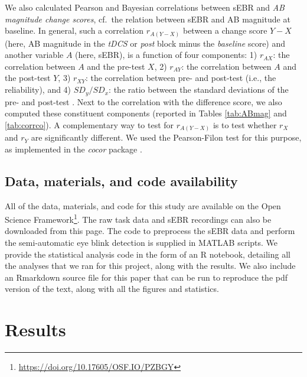 \documentclass[11pt,]{memoir}
\let\rmarkdownfootnote\footnote%
\def\footnote{\protect\rmarkdownfootnote}
\renewcommand{\href}[2]{#2\footnote{\url{#1}}} %
\begin{document}
We also calculated Pearson and Bayesian correlations between sEBR and \emph{AB magnitude change scores}, cf.~the relation between sEBR and AB magnitude at baseline. In general, such a correlation \(r_{A(Y-X)}\) between a change score \(Y-X\) (here, AB magnitude in the \emph{tDCS} or \emph{post} block minus the \emph{baseline} score) and another variable \(A\) (here, sEBR), is a function of four components: 1) \(r_{AX}\): the correlation between \(A\) and the pre-test \(X\), 2) \(r_{AY}\): the correlation between \(A\) and the post-test \(Y\), 3) \(r_{XY}\): the correlation between pre- and post-test (i.e., the reliability), and 4) \(SD_y / SD_x\): the ratio between the standard deviations of the pre- and post-test \autocites{Gardner1987}{Griffin1999}. Next to the correlation with the difference score, we also computed these constituent components (reported in Tables \ref{tab:ABmag} and \ref{tab:corrco}). A complementary way to test for \(r_{A(Y-X)}\) is to test whether \(r_X\) and \(r_Y\) are significantly different. We used the Pearson-Filon test \autocite*{Pearson1898} for this purpose, as implemented in the \emph{cocor} package \autocite[Version 1.1-3;][]{R-cocor}.

\hypertarget{data-materials-and-code-availability-2}{%
\subsection{Data, materials, and code availability}\label{data-materials-and-code-availability-2}}

All of the data, materials, and code for this study are available on the \href{https://doi.org/10.17605/OSF.IO/PZBGY}{Open Science Framework}. The raw task data and sEBR recordings can also be downloaded from this page. The code to preprocess the sEBR data and perform the semi-automatic eye blink detection \autocites[cf.][]{Slagter2013}{Kruis2016} is supplied in MATLAB scripts. We provide the statistical analysis code in the form of an R notebook, detailing all the analyses that we ran for this project, along with the results. We also include an Rmarkdown \autocite{Xie2018} source file for this paper that can be run to reproduce the pdf version of the text, along with all the figures and statistics.

\hypertarget{AB_sEBR-results}{%
\section{Results}\label{AB_sEBR-results}}
\end{document}
